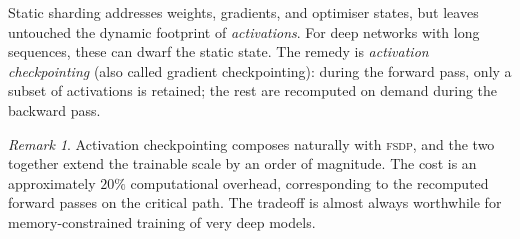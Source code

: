 \documentclass[11pt,a4paper]{article}
\theoremstyle{definition}
\theoremstyle{remark}
\newtheorem*{remark}{Remark}
\newcommand{\FSDP}{\textsc{fsdp}}
\begin{document}
Static sharding addresses weights, gradients, and optimiser states, but leaves untouched the dynamic footprint of \emph{activations}. For deep networks with long sequences, these can dwarf the static state. The remedy is \emph{activation checkpointing} (also called gradient checkpointing): during the forward pass, only a subset of activations is retained; the rest are recomputed on demand during the backward pass.

\begin{remark}
Activation checkpointing composes naturally with \FSDP{}, and the two together extend the trainable scale by an order of magnitude. The cost is an approximately $20\%$ computational overhead, corresponding to the recomputed forward passes on the critical path. The tradeoff is almost always worthwhile for memory-constrained training of very deep models.
\end{remark}
\end{document}
